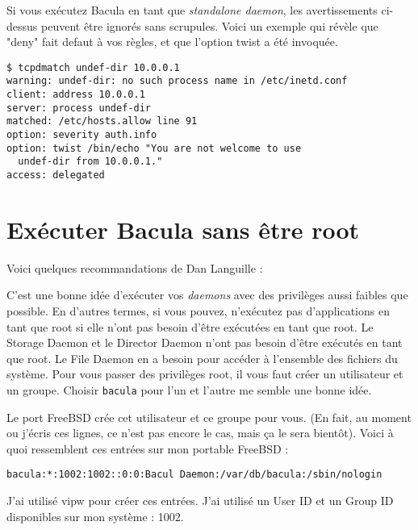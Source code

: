 {Si vous ex\'ecutez Bacula en tant que {\it standalone daemon}, les
avertissements ci-dessus peuvent \^etre ignor\'es sans scrupules. Voici un
exemple qui r\'ev\`ele que "deny" fait defaut \`a vos r\`egles, et que
l'option twist a \'et\'e invoqu\'ee. 

\footnotesize
\begin{verbatim}
$ tcpdmatch undef-dir 10.0.0.1
warning: undef-dir: no such process name in /etc/inetd.conf
client: address 10.0.0.1
server: process undef-dir
matched: /etc/hosts.allow line 91
option: severity auth.info
option: twist /bin/echo "You are not welcome to use
  undef-dir from 10.0.0.1."
access: delegated
\end{verbatim}
\normalsize

\section{Ex\'ecuter Bacula sans \^etre root}

Voici quelques recommandations de Dan Languille :  

C'est une bonne id\'ee d'ex\'ecuter vos {\it daemons} avec des  privil\`eges
aussi faibles que possible. En d'autres termes,  si vous pouvez, n'ex\'ecutez
pas d'applications en tant que root  si elle n'ont pas besoin d'\^etre
ex\'ecut\'ees en tant que root.  Le Storage Daemon et le Director Daemon n'ont
pas besoin  d'\^etre ex\'ecut\'es en tant que root. Le File Daemon en a besoin
pour acc\'eder  \`a l'ensemble des fichiers du syst\`eme. Pour vous passer des
privil\`eges  root, il vous faut cr\'eer un utilisateur et un groupe. Choisir
{\tt bacula}  pour l'un et l'autre me semble une bonne id\'ee.  

Le port FreeBSD cr\'ee cet utilisateur et ce groupe pour vous. (En fait, au
moment  ou j'\'ecris ces lignes, ce n'est pas encore le cas, mais \c{c}a le
sera bient\^ot).  Voici \`a quoi ressemblent ces entr\'ees sur mon portable
FreeBSD : 

\footnotesize
\begin{verbatim}
bacula:*:1002:1002::0:0:Bacul Daemon:/var/db/bacula:/sbin/nologin
\end{verbatim}
\normalsize

J'ai utilis\'e vipw pour cr\'eer ces entr\'ees. J'ai utilis\'e un User ID et
un Group ID  disponibles sur mon syst\`eme : 1002.  

}
